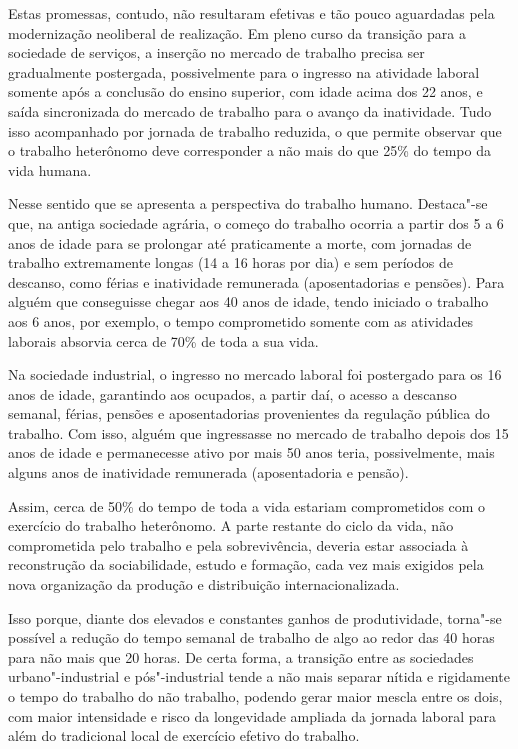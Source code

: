 Estas promessas, contudo, não resultaram efetivas e tão pouco aguardadas
pela modernização neoliberal de realização. Em pleno curso da transição
para a sociedade de serviços, a inserção no mercado de trabalho precisa
ser gradualmente postergada, possivelmente para o ingresso na atividade
laboral somente após a conclusão do ensino superior, com idade acima dos
22 anos, e saída sincronizada do mercado de trabalho para o avanço da
inatividade. Tudo isso acompanhado por jornada de trabalho reduzida, o
que permite observar que o trabalho heterônomo deve corresponder a não
mais do que 25\% do tempo da vida humana.

Nesse sentido que se apresenta a perspectiva do trabalho humano.
Destaca"-se que, na antiga sociedade agrária, o começo do trabalho ocorria
a partir dos 5 a 6 anos de idade para se prolongar até praticamente a
morte, com jornadas de trabalho extremamente longas (14 a 16 horas por
dia) e sem períodos de descanso, como férias e inatividade remunerada
(aposentadorias e pensões). Para alguém que conseguisse chegar aos 40
anos de idade, tendo iniciado o trabalho aos 6 anos, por exemplo, o
tempo comprometido somente com as atividades laborais absorvia cerca de
70\% de toda a sua vida.

Na sociedade industrial, o ingresso no mercado laboral foi postergado
para os 16 anos de idade, garantindo aos ocupados, a partir daí, o
acesso a descanso semanal, férias, pensões e aposentadorias provenientes
da regulação pública do trabalho. Com isso, alguém que ingressasse no
mercado de trabalho depois dos 15 anos de idade e permanecesse ativo por
mais 50 anos teria, possivelmente, mais alguns anos de inatividade
remunerada (aposentadoria e pensão).

Assim, cerca de 50\% do tempo de toda a vida estariam comprometidos com
o exercício do trabalho heterônomo. A parte restante do ciclo da vida,
não comprometida pelo trabalho e pela sobrevivência, deveria estar
associada à reconstrução da sociabilidade, estudo e formação, cada vez
mais exigidos pela nova organização da produção e distribuição
internacionalizada.

Isso porque, diante dos elevados e constantes ganhos de produtividade,
torna"-se possível a redução do tempo semanal de trabalho de algo ao
redor das 40 horas para não mais que 20 horas. De certa forma, a
transição entre as sociedades urbano"-industrial e pós"-industrial tende a
não mais separar nítida e rigidamente o tempo do trabalho do não
trabalho, podendo gerar maior mescla entre os dois, com maior
intensidade e risco da longevidade ampliada da jornada laboral para além
do tradicional local de exercício efetivo do trabalho.


